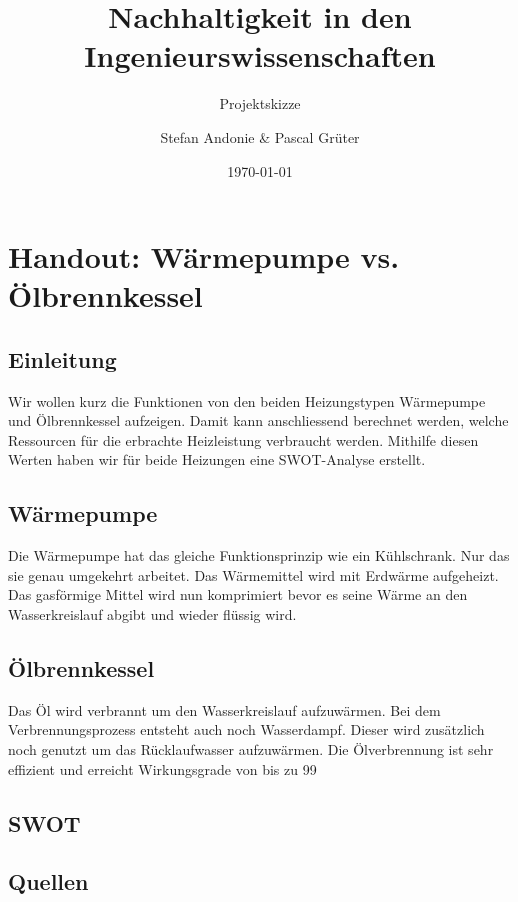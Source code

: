 \documentclass[09pt,paper=a4,final]{scrartcl}
\title{Nachhaltigkeit in den Ingenieurswissenschaften}
\subtitle{Projektskizze}
\author{Stefan Andonie \& Pascal Grüter}
\date{\today{}}
\begin{document}
\section*{Handout: Wärmepumpe vs. Ölbrennkessel}

\subsection*{Einleitung}

Wir wollen kurz die Funktionen von den beiden Heizungstypen Wärmepumpe und Ölbrennkessel aufzeigen. Damit kann anschliessend berechnet werden, welche Ressourcen für die erbrachte Heizleistung verbraucht werden. Mithilfe diesen Werten haben wir für beide Heizungen eine SWOT-Analyse erstellt.

\subsection*{Wärmepumpe}

Die Wärmepumpe hat das gleiche Funktionsprinzip wie ein Kühlschrank. Nur das sie genau umgekehrt arbeitet. Das Wärmemittel wird mit Erdwärme aufgeheizt. Das gasförmige Mittel wird nun komprimiert bevor es seine Wärme an den Wasserkreislauf abgibt und wieder flüssig wird.

\subsection*{Ölbrennkessel}

Das Öl wird verbrannt um den Wasserkreislauf aufzuwärmen. Bei dem Verbrennungsprozess entsteht auch noch Wasserdampf. Dieser wird zusätzlich noch genutzt um das Rücklaufwasser aufzuwärmen. Die Ölverbrennung ist sehr effizient und erreicht Wirkungsgrade von bis zu 99%

\subsection*{SWOT}


\subsection*{Quellen}
\end{document}
